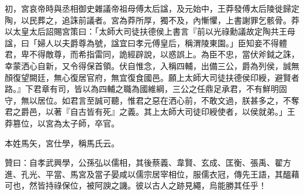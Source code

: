 \begin{pinyinscope}
初，宮哀帝時與丞相御史雜議帝祖母傅太后諡，及元始中，王莽發傅太后陵徙歸定陶，以民葬之，追誅前議者。宮為莽所厚，獨不及，內慚懼，上書謝罪乞骸骨。莽以太皇太后詔賜宮策曰：「太師大司徒扶德侯上書言『前以光祿勳議故定陶共王母諡，曰「婦人以夫爵尊為號，諡宜曰孝元傅皇后，稱渭陵東園。」臣知妾不得體君，卑不得敵尊，而希指雷同，詭經辟說，以惑誤上。為臣不忠，當伏斧鉞之誅，幸蒙洒心自新，又令得保首領。伏自惟念，入稱四輔，出備三公，爵為列侯，誠無顏復望闕廷，無心復居官府，無宜復食國邑。願上太師大司徒扶德侯印綬，避賢者路。』下君章有司，皆以為四輔之職為國維綱，三公之任鼎足承君，不有鮮明固守，無以居位。如君言至誠可聽，惟君之惡在洒心前，不敢文過，朕甚多之，不奪君之爵邑，以著『自古皆有死』之義。其上太師大司徒印綬使者，以侯就弟。」王莽篡位，以宮為太子師，卒官。

本姓馬矢，宮仕學，稱馬氏云。

贊曰：自孝武興學，公孫弘以儒相，其後蔡義、韋賢、玄成、匡衡、張禹、翟方進、孔光、平當、馬宮及當子晏咸以儒宗居宰相位，服儒衣冠，傳先王語，其醞藉可也，然皆持祿保位，被阿諛之譏。彼以古人之跡見繩，烏能勝其任乎！


\end{pinyinscope}